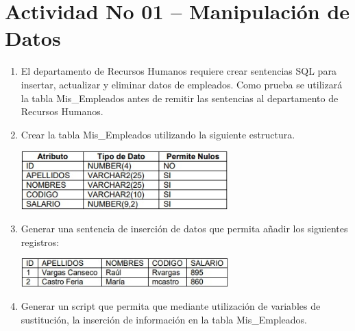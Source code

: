\section{Actividad No 01 – Manipulaci\'on de Datos} 

\begin{enumerate}[1.]
	\item El departamento de Recursos Humanos requiere crear sentencias SQL para insertar, actualizar y eliminar datos de empleados. Como prueba se utilizará la tabla Mis\_Empleados antes de remitir las sentencias al departamento de Recursos Humanos.

	\item Crear la tabla Mis\_Empleados utilizando la siguiente estructura.
	\begin{center}
	\includegraphics[width=8cm]{./Imagenes/imagen0102} 
	\end{center}
	\item Generar una sentencia de inserción de datos que permita añadir los siguientes registros:
	\begin{center}
	\includegraphics[width=8cm]{./Imagenes/imagen0103} 
	\end{center}

	\item Generar un script que permita que mediante utilización de variables de sustitución, la inserción de información en la tabla Mis\_Empleados.


\end{enumerate}
